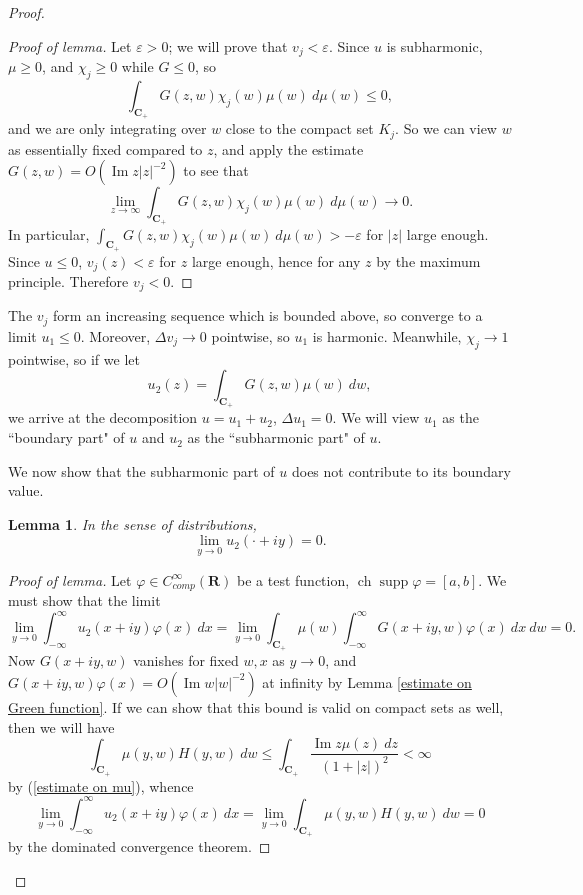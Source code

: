 \documentclass[12pt]{report}
\newcommand{\RR}{\mathbf{R}}
\newcommand{\CC}{\mathbf{C}}
\DeclareMathOperator{\ch}{ch}
\DeclareMathOperator{\supp}{supp}
\renewcommand{\Im}{\operatorname{Im}}
\newtheorem{lemma}[theorem]{Lemma}
\theoremstyle{definition}
\begin{document}
\begin{proof}
\begin{proof}[Proof of lemma]
    Let $\varepsilon > 0$; we will prove that $v_j < \varepsilon$. Since $u$ is subharmonic, $\mu \geq 0$, and $\chi_j \geq 0$ while $G \leq 0$, so
    $$\int_{\CC_+} G(z, w) \chi_j(w) \mu(w) ~d\mu(w) \leq 0,$$ and we are only integrating over $w$ close to the compact set $K_j$. So we can view $w$ as essentially fixed compared to $z$, and apply the estimate $G(z, w) = O(\Im z|z|^{-2})$ to see that
    $$\lim_{z \to \infty} \int_{\CC_+} G(z, w) \chi_j(w) \mu(w) ~d\mu(w) \to 0.$$
    In particular, $\int_{\CC_+} G(z, w) \chi_j(w) \mu(w) ~d\mu(w) > -\varepsilon$ for $|z|$ large enough. Since $u \leq 0$, $v_j(z) < \varepsilon$ for $z$ large enough, hence for any $z$ by the maximum principle. Therefore $v_j < 0$.
\end{proof}
    The $v_j$ form an increasing sequence which is bounded above, so converge to a limit $u_1 \leq 0$. Moreover, $\Delta v_j \to 0$ pointwise, so $u_1$ is harmonic. Meanwhile, $\chi_j \to 1$ pointwise, so if we let
$$u_2(z) = \int_{\CC_+} G(z, w) \mu(w) ~dw,$$
    we arrive at the decomposition $u = u_1 + u_2$, $\Delta u_1 = 0$. We will view $u_1$ as the ``boundary part" of $u$ and $u_2$ as the ``subharmonic part" of $u$.

    We now show that the subharmonic part of $u$ does not contribute to its boundary value.
\begin{lemma}
    In the sense of distributions,
$$\lim_{y \to 0} u_2(\cdot + iy) = 0.$$
\end{lemma}
\begin{proof}[Proof of lemma]
    Let $\varphi \in C^\infty_{comp}(\RR)$ be a test function, $\ch \supp \varphi = [a, b]$. We must show that the limit
$$\lim_{y \to 0} \int_{-\infty}^\infty u_2(x + iy) \varphi(x) ~dx = \lim_{y \to 0} \int_{\CC_+} \mu(w) \int_{-\infty}^\infty G(x + iy, w) \varphi(x) ~dx ~dw = 0.$$
    Now $G(x + iy, w)$ vanishes for fixed $w,x$ as $y \to 0$, and $G(x + iy, w) \varphi(x) = O(\Im w|w|^{-2})$ at infinity by Lemma \ref{estimate on Green function}. If we can show that this bound is valid on compact sets as well, then we will have
$$\int_{\CC_+} \mu(y, w) H(y, w) ~dw \leq \int_{\CC_+} \frac{\Im z \mu(z) ~dz}{(1 + |z|)^2} < \infty$$
    by (\ref{estimate on mu}), whence
$$\lim_{y \to 0} \int_{-\infty}^\infty u_2(x + iy) \varphi(x) ~dx = \lim_{y \to 0} \int_{\CC_+} \mu(y, w) H(y, w) ~dw = 0$$
    by the dominated convergence theorem.


\end{proof}
\end{proof}
\end{document}
